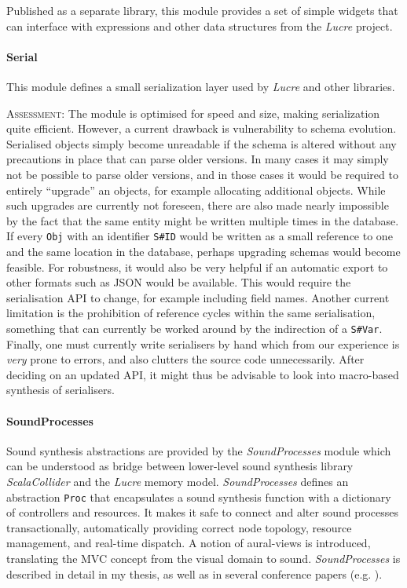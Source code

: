 \documentclass[11pt,a4paper]{article}
\newcommand{\software}[1]{\textit{#1}}
\newcommand{\assessment}[0]{\textsc{Assessment:}}
\begin{document}
Published as a separate library, this module provides a set of simple widgets that can interface with expressions and other data structures from the \software{Lucre} project.

\paragraph{Serial}

This module defines a small serialization layer used by \software{Lucre} and other libraries.

\assessment{} The module is optimised for speed and size, making serialization quite efficient. However, a current drawback is vulnerability to schema evolution. Serialised objects simply become unreadable if the schema is altered without any precautions in place that can parse older versions. In many cases it may simply not be possible to parse older versions, and in those cases it would be required to entirely ``upgrade'' an objects, for example allocating additional objects. While such upgrades are currently not foreseen, there are also made nearly impossible by the fact that the same entity might be written multiple times in the database. If every \verb!Obj! with an identifier \verb!S#ID! would be written as a small reference to one and the same location in the database, perhaps upgrading schemas would become feasible. For robustness, it would also be very helpful if an automatic export to other formats such as JSON would be available. This would require the serialisation API to change, for example including field names. Another current limitation is the prohibition of reference cycles within the same serialisation, something that can currently be worked around by the indirection of a \verb!S#Var!. Finally, one must currently write serialisers by hand which from our experience is \emph{very} prone to errors, and also clutters the source code unnecessarily. After deciding on an updated API, it might thus be advisable to look into macro-based synthesis of serialisers.

\paragraph{SoundProcesses}

Sound synthesis abstractions are provided by the \software{SoundProcesses} module which can be understood as bridge between lower-level sound synthesis library \software{ScalaCollider} and the \software{Lucre} memory model. \software{SoundProcesses} defines an abstraction \verb!Proc! that encapsulates a sound synthesis function with a dictionary of controllers and resources. It makes it safe to connect and alter sound processes transactionally, automatically providing correct node topology, resource management, and real-time dispatch. A notion of aural-views is introduced, translating the MVC concept from the visual domain to sound. \software{SoundProcesses} is described in detail in my thesis, as well as in several conference papers (e.g. \cite{rutz2014sound}).
\end{document}
